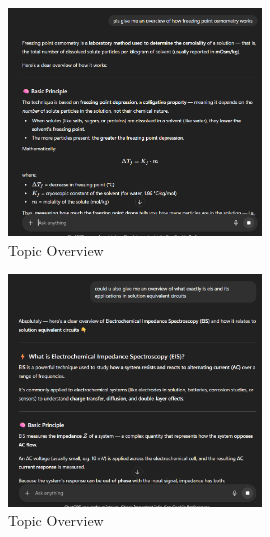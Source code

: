 \begin{figure}[H]
    \centering
    \includegraphics[width=0.6\textwidth]{figures/AI_Usage/freezing_overview.png}
    \caption{Topic Overview}
\end{figure}

\begin{figure}[H]
    \centering
    \includegraphics[width=0.6\textwidth]{figures/AI_Usage/eis_overview.png}
    \caption{Topic Overview}
\end{figure}

